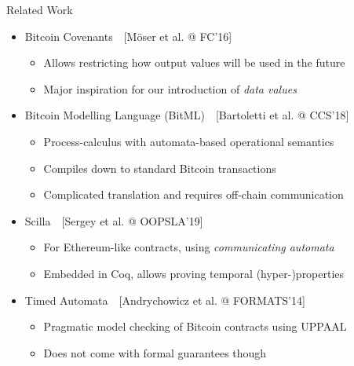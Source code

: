 \begin{frame}{Related Work}

\begin{itemize}
\item \alert{Bitcoin Covenants}~~[Möser et al. @ FC'16]
  \begin{itemize}
  \item Allows restricting how output values will be used in the future
  \item Major inspiration for our introduction of \textit{data values}
  \end{itemize}
\item \alert{Bitcoin Modelling Language (BitML)}~~[Bartoletti et al. @ CCS'18]
  \begin{itemize}
  \item Process-calculus with automata-based operational semantics
  \item Compiles down to standard Bitcoin transactions
  \item Complicated translation and requires off-chain communication
  \end{itemize}
\item \alert{Scilla}~~[Sergey et al. @ OOPSLA'19]
  \begin{itemize}
  \item For Ethereum-like contracts, using \textit{communicating automata}
  \item Embedded in Coq, allows proving temporal (hyper-)properties
  \end{itemize}
\item \alert{Timed Automata}~~[Andrychowicz et al. @ FORMATS'14]
  \begin{itemize}
  \item Pragmatic model checking of Bitcoin contracts using \textsc{UPPAAL}
  \item Does not come with formal guarantees though
  \end{itemize}
\end{itemize}

\end{frame}

